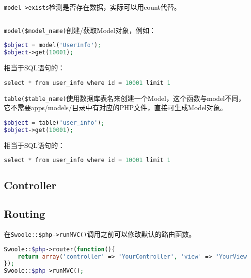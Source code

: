 \begin{lstlisting}[language=PHP]

\end{lstlisting}

\texttt{model->exists}检测是否存在数据，实际可以用count代替。



\begin{lstlisting}[language=PHP]

\end{lstlisting}

\texttt{model(\$model\_name)}创建/获取Model对象，例如：

\begin{lstlisting}[language=PHP]
$object = model('UserInfo');
$object->get(10001);
\end{lstlisting}

相当于SQL语句的：

\begin{lstlisting}[language=PHP]
select * from user_info where id = 10001 limit 1
\end{lstlisting}


\texttt{table(\$table\_name)}使用数据库表名来创建一个Model，这个函数与model不同，它不需要apps/models/目录中有对应的PHP文件，直接可生成Model对象。

\begin{lstlisting}[language=PHP]
$object = table('user_info');
$object->get(10001);
\end{lstlisting}

相当于SQL语句的：


\begin{lstlisting}[language=PHP]
select * from user_info where id = 10001 limit 1
\end{lstlisting}




\subsection{Controller}




\subsection{Routing}


在\texttt{Swoole::\$php->runMVC()}调用之前可以修改默认的路由函数。


\begin{lstlisting}[language=PHP]
Swoole::$php->router(function(){
    return array('controller' => 'YourController', 'view' => 'YourView');
});
Swoole::$php->runMVC();
\end{lstlisting}

